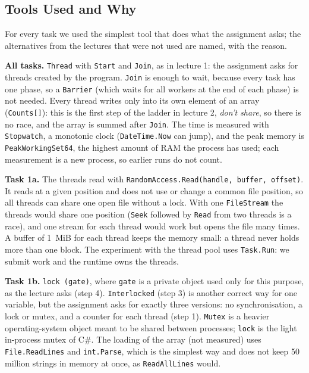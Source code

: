 \documentclass[12pt,a4paper]{article}
\begin{document}
\subsection{Tools Used and Why}

For every task we used the simplest tool that does what the assignment asks; the alternatives from the lectures that were not used are named, with the reason.

\textbf{All tasks.} \texttt{Thread} with \texttt{Start} and \texttt{Join}, as in lecture 1: the assignment asks for threads created by the program. \texttt{Join} is enough to wait, because every task has one phase, so a \texttt{Barrier} (which waits for all workers at the end of each phase) is not needed. Every thread writes only into its own element of an array (\texttt{Counts[]}): this is the first step of the ladder in lecture 2, \textit{don't share}, so there is no race, and the array is summed after \texttt{Join}. The time is measured with \texttt{Stopwatch}, a monotonic clock (\texttt{DateTime.Now} can jump), and the peak memory is \texttt{PeakWorkingSet64}, the highest amount of RAM the process has used; each measurement is a new process, so earlier runs do not count.

\textbf{Task 1a.} The threads read with \texttt{RandomAccess.Read(handle, buffer, offset)}. It reads at a given position and does not use or change a common file position, so all threads can share one open file without a lock. With one \texttt{FileStream} the threads would share one position (\texttt{Seek} followed by \texttt{Read} from two threads is a race), and one stream for each thread would work but opens the file many times. A buffer of 1~MiB for each thread keeps the memory small: a thread never holds more than one block. The experiment with the thread pool uses \texttt{Task.Run}: we submit work and the runtime owns the threads.

\textbf{Task 1b.} \texttt{lock (gate)}, where \texttt{gate} is a private object used only for this purpose, as the lecture asks (step 4). \texttt{Interlocked} (step 3) is another correct way for one variable, but the assignment asks for exactly three versions: no synchronisation, a lock or mutex, and a counter for each thread (step 1). \texttt{Mutex} is a heavier operating-system object meant to be shared between processes; \texttt{lock} is the light in-process mutex of C\#. The loading of the array (not measured) uses \texttt{File.ReadLines} and \texttt{int.Parse}, which is the simplest way and does not keep 50 million strings in memory at once, as \texttt{ReadAllLines} would.
\end{document}
